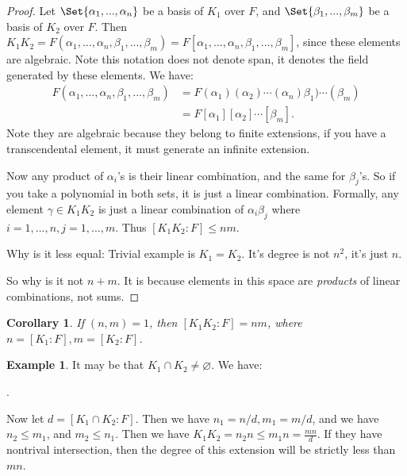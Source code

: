 \documentclass[9pt,reqno,twoside]{amsbook}
\let\emptyset\varnothing
\theoremstyle{plain}
\numberwithin{section}{chapter}
\numberwithin{equation}{chapter}
\newtheorem{Cor}[theorem]{Corollary}
\theoremstyle{definition}
\newtheorem{Ex}[theorem]{Example}
\theoremstyle{remark}
\theoremstyle{plain}
\newcommand{\bee}{\begin{equation}\begin{aligned}}
\newcommand{\eee}{\end{aligned}\end{equation}}
\newcommand{\fracc}{\frac}
\renewcommand{\leq}{\leqslant}
\begin{document}
\begin{proof}
Let $\Set{\alpha_1,...,\alpha_n}$ be a basis of $K_1$ over $F$, and $\Set{\beta_1,...,\beta_m}$ be a basis of $K_2$ over $F$. Then $K_1K_2 = F(\alpha_1,...,\alpha_n,\beta_1,...,\beta_m) = F[\alpha_1,...,\alpha_n,\beta_1,...,\beta_m]$, since these elements are algebraic. Note this notation does not denote span, it denotes the field generated by these elements. We have:
\bee
F(\alpha_1,...,\alpha_n,\beta_1,...,\beta_m) &= F(\alpha_1)(\alpha_2) \cdots(\alpha_n)\beta_1)\cdots(\beta_m)\\
&= F[\alpha_1][\alpha_2]\cdots [\beta_m].
\eee
Note they are algebraic because they belong to finite extensions, if you have a transcendental element, it must generate an infinite extension. 

Now any product of $\alpha_i$'s is their linear combination, and the same for $\beta_j$'s. So if you take a polynomial in both sets, it is just a linear combination. Formally, any element $\gamma \in K_1K_2$ is just a linear combination of $\alpha_i\beta_j$ where $i = 1,...,n,j = 1,...,m$. Thus $[K_1K_2:F] \leq nm$. 

Why is it less equal: Trivial example is $K_1 = K_2$. It's degree is not $n^2$, it's just $n$. 

So why is it not $n + m$. It is because elements in this space are \textit{products} of linear combinations, not sums. 
\end{proof}

\begin{Cor}
If $(n,m) = 1$, then $[K_1K_2:F] = nm$, where $n = [K_1:F],m = [K_2:F]$. 
\end{Cor}

\begin{Ex}
It may be that $K_1 \cap K_2 \neq \emptyset$. We have:
\begin{center}
.
\end{center}
Now let $d = [K_1\cap K_2:F]$. Then we have $n_1 = n/d,m_1 = m/d$, and we have $n_2 \leq m_1$, and $m_2 \leq n_1$. Then we have $K_1K_2  = n_2n \leq m_1n = \fracc{mn}{d}$. If they have nontrival intersection, then the degree of this extension will be strictly less than $mn$. 
\end{Ex}
\end{document}
